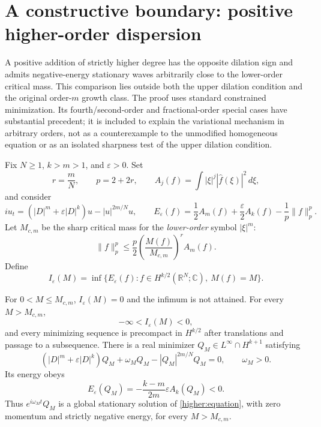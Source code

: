 \section{A constructive boundary: positive higher-order dispersion}
\label{sec:superorder}

A positive addition of strictly higher degree has the opposite
dilation sign and admits negative-energy stationary waves arbitrarily
close to the lower-order critical mass. This comparison lies outside
both the upper dilation condition and the original order-$m$ growth
class. The proof uses standard constrained minimization. Its
fourth/second-order and fractional-order special cases have substantial
precedent; it is included to explain the variational mechanism in
arbitrary orders, not as a counterexample to the unmodified homogeneous
equation or as an isolated sharpness test of the upper dilation condition.

Fix $N\ge1$, $k>m>1$, and $\varepsilon>0$. Set
\[
 r=\frac mN,\qquad p=2+2r,\qquad
 A_j(f)=\int |\xi|^j|\widehat f(\xi)|^2\,d\xi,
\]
and consider
\begin{equation}\label{higher:equation}
 iu_t=(|D|^m+\varepsilon|D|^k)u-|u|^{2m/N}u,
 \qquad
 E_\varepsilon(f)=\frac12A_m(f)+\frac\varepsilon2A_k(f)
                    -\frac1p\|f\|_p^p.
\end{equation}
Let $M_{c,m}$ be the sharp critical mass for the \emph{lower-order}
symbol $|\xi|^m$:
\begin{equation}\label{higher:gn}
 \|f\|_p^p\le\frac p2
       \left(\frac{M(f)}{M_{c,m}}\right)^r A_m(f).
\end{equation}
Define
\[
 I_\varepsilon(M)=\inf\{E_\varepsilon(f):
      f\in H^{k/2}(\mathbb R^N;\mathbb C),\ M(f)=M\}.
\]

\begin{theorem}
\label{higher:existence}
For $0<M\le M_{c,m}$, $I_\varepsilon(M)=0$ and the infimum is not
attained. For every $M>M_{c,m}$,
\[
 -\infty<I_\varepsilon(M)<0,
\]
and every minimizing sequence is precompact in $H^{k/2}$ after
translations and passage to a subsequence. There is a real minimizer
$Q_M\in L^\infty\cap H^{k+1}$ satisfying
\begin{equation}\label{higher:profile}
 (|D|^m+\varepsilon|D|^k)Q_M+\omega_MQ_M
       -|Q_M|^{2m/N}Q_M=0,
 \qquad \omega_M>0.
\end{equation}
Its energy obeys
\begin{equation}\label{higher:energy}
 E_\varepsilon(Q_M)
       =-\frac{k-m}{2m}\varepsilon A_k(Q_M)<0.
\end{equation}
Thus $e^{i\omega_Mt}Q_M$ is a global stationary solution of
\eqref{higher:equation}, with zero momentum and strictly negative
energy, for every $M>M_{c,m}$.
\end{theorem}

